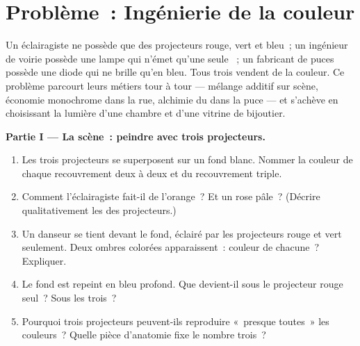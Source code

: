 \section{Problème~: Ingénierie de la couleur}

\begin{problem}
\label{pb:g11:color-light-sources:1}
Un éclairagiste ne possède que des projecteurs rouge, vert et bleu~; un
ingénieur de voirie possède une lampe qui n'émet qu'une seule
~; un fabricant de puces possède
une diode qui ne brille qu'en bleu. Tous trois vendent de la couleur.
Ce problème parcourt leurs métiers tour à tour --- mélange additif sur
scène, économie monochrome dans la rue, alchimie du
 dans la puce --- et s'achève en
choisissant la lumière d'une chambre et d'une vitrine de bijoutier.

\medskip
\noindent\textbf{Partie I --- La scène~: peindre avec trois projecteurs.}
\begin{enumerate}
  \item Les trois projecteurs se superposent sur un fond blanc. Nommer
        la couleur de chaque recouvrement deux à deux et du
        recouvrement triple.
  \item Comment l'éclairagiste fait-il de l'orange~? Et un rose pâle~?
        (Décrire qualitativement les
         des projecteurs.)
  \item Un danseur se tient devant le fond, éclairé par les projecteurs
        rouge et vert seulement. Deux ombres colorées apparaissent~:
        couleur de chacune~? Expliquer.
  \item Le fond est repeint en bleu profond. Que devient-il sous le
        projecteur rouge seul~? Sous les trois~?
  \item Pourquoi trois projecteurs peuvent-ils reproduire «~presque
        toutes~» les couleurs~? Quelle pièce d'anatomie fixe le nombre
        trois~?
\end{enumerate}


\end{problem}
